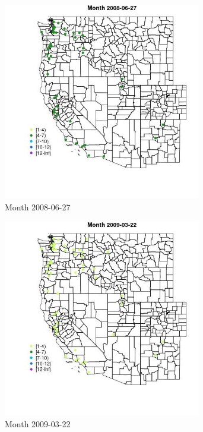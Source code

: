 \begin{figure} 
\centering  
\includegraphics[width=0.77\textwidth]{Code_Outputs/Report_ML_input_PM25_Step4_part_e_de_duplicated_aves_MapObsMonth2008-06-27.jpg} 
\caption{\label{fig:Report_ML_input_PM25_Step4_part_e_de_duplicated_avesMapObsMonth2008-06-27}Month 2008-06-27} 
\end{figure} 
 

\clearpage 

\begin{figure} 
\centering  
\includegraphics[width=0.77\textwidth]{Code_Outputs/Report_ML_input_PM25_Step4_part_e_de_duplicated_aves_MapObsMonth2009-03-22.jpg} 
\caption{\label{fig:Report_ML_input_PM25_Step4_part_e_de_duplicated_avesMapObsMonth2009-03-22}Month 2009-03-22} 
\end{figure} 
 

